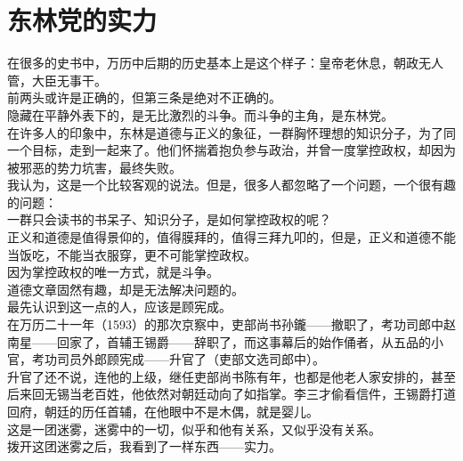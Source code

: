 \section{东林党的实力}
\ifnum{}
	\begin{multicols}{\theparacolNo}
\fi
在很多的史书中，万历中后期的历史基本上是这个样子：皇帝老休息，朝政无人管，大臣无事干。\\

前两头或许是正确的，但第三条是绝对不正确的。\\

隐藏在平静外表下的，是无比激烈的斗争。而斗争的主角，是东林党。\\

在许多人的印象中，东林是道德与正义的象征，一群胸怀理想的知识分子，为了同一个目标，走到一起来了。他们怀揣着抱负参与政治，并曾一度掌控政权，却因为被邪恶的势力坑害，最终失败。\\

我认为，这是一个比较客观的说法。但是，很多人都忽略了一个问题，一个很有趣的问题：\\

一群只会读书的书呆子、知识分子，是如何掌控政权的呢？\\

正义和道德是值得景仰的，值得膜拜的，值得三拜九叩的，但是，正义和道德不能当饭吃，不能当衣服穿，更不可能掌控政权。\\

因为掌控政权的唯一方式，就是斗争。\\

道德文章固然有趣，却是无法解决问题的。\\

最先认识到这一点的人，应该是顾宪成。\\

在万历二十一年（1593）的那次京察中，吏部尚书孙鑨——撤职了，考功司郎中赵南星——回家了，首辅王锡爵——辞职了，而这事幕后的始作俑者，从五品的小官，考功司员外郎顾宪成——升官了（吏部文选司郎中）。\\

升官了还不说，连他的上级，继任吏部尚书陈有年，也都是他老人家安排的，甚至后来回无锡当老百姓，他依然对朝廷动向了如指掌。李三才偷看信件，王锡爵打道回府，朝廷的历任首辅，在他眼中不是木偶，就是婴儿。\\

这是一团迷雾，迷雾中的一切，似乎和他有关系，又似乎没有关系。\\

拨开这团迷雾之后，我看到了一样东西——实力。\\


\end{multicols}
